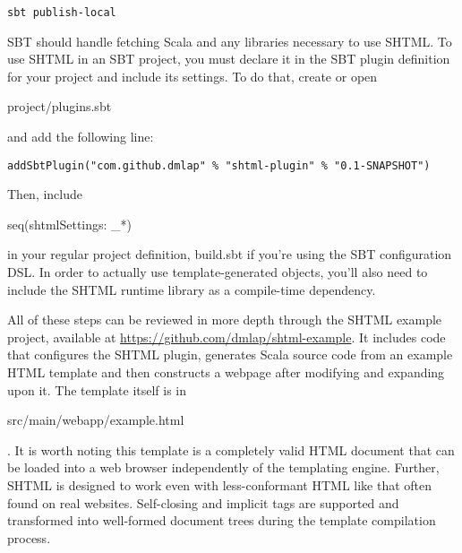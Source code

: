 \documentclass{article}
\begin{document}
\begin{verbatim}
sbt publish-local
\end{verbatim}

SBT should handle fetching Scala and any libraries necessary to use SHTML. To use SHTML in an SBT project, you must declare it in the SBT plugin definition for your project and include its settings. To do that, create or open \begin{tt}project/plugins.sbt\end{tt} and add the following line:

\begin{verbatim}
addSbtPlugin("com.github.dmlap" % "shtml-plugin" % "0.1-SNAPSHOT")
\end{verbatim}

Then, include \begin{tt}seq(shtmlSettings: \_*)\end{tt} in your regular project definition, build.sbt if you're using the SBT configuration DSL. In order to actually use template-generated objects, you'll also need to include the SHTML runtime library as a compile-time dependency.

All of these steps can be reviewed in more depth through the SHTML example project, available at \url{https://github.com/dmlap/shtml-example}. It includes code that configures the SHTML plugin, generates Scala source code from an example HTML template and then constructs a webpage after modifying and expanding upon it. The template itself is in \begin{tt}src/main/webapp/example.html\end{tt}. It is worth noting this template is a completely valid HTML document that can be loaded into a web browser independently of the templating engine. Further, SHTML is designed to work even with less-conformant HTML like that often found on real websites. Self-closing and implicit tags are supported and transformed into well-formed document trees during the template compilation process.
\end{document}
